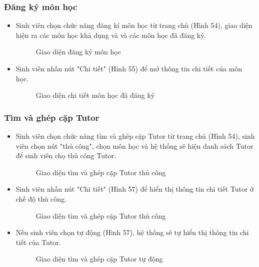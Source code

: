 \subsubsection*{Đăng ký môn học}
\begin{itemize}
    \item Sinh viên chọn chức năng đăng kí môn học từ trang chủ (Hình 54), giao diện hiện ra các môn học khả dụng và và các môn học đã đăng ký.
    \begin{figure}[H]
    \centering
    \setlength{\fboxsep}{2pt}     
    \setlength{\fboxrule}{0.5pt}   
    \caption{Giao diện đăng ký môn học}
    \end{figure}
    \item Sinh viên nhấn nút "Chi tiết" (Hình 55) để mở thông tin chi tiết của môn học.
    \begin{figure}[H]
    \centering
    \setlength{\fboxsep}{2pt}     
    \setlength{\fboxrule}{0.5pt}   
    \caption{Giao diện chi tiết môn học đã đăng ký}
    \end{figure}
\end{itemize}

\subsubsection*{Tìm và ghép cặp Tutor}
\begin{itemize}
    \item Sinh viên chọn chức năng tìm và ghép cặp Tutor từ trang chủ (Hình 54), sinh viên chọn nút "thủ công", chọn môn học và hệ thống sẽ hiện danh sách Tutor để sinh viên chọ thủ công Tutor.
    \begin{figure}[H]
    \centering
    \setlength{\fboxsep}{2pt}     
    \setlength{\fboxrule}{0.5pt}   
    \caption{Giao diện tìm và ghép cặp Tutor thủ công}
    \end{figure}
    \item Sinh viên nhấn nút "Chi tiết" (Hình 57) để hiển thị thông tin chi tiết Tutor ở chế độ thủ công.
    \begin{figure}[H]
    \centering
    \setlength{\fboxsep}{2pt}     
    \setlength{\fboxrule}{0.5pt}   
    \caption{Giao diện tìm và ghép cặp Tutor thủ công}
    \end{figure}
    \item Nếu sinh viên chọn tự động (Hình 57), hệ thống sẽ tự hiển thị thông tin chi tiết của Tutor.
    \begin{figure}[H]
    \centering
    \setlength{\fboxsep}{2pt}     
    \setlength{\fboxrule}{0.5pt}   
    \caption{Giao diện tìm và ghép cặp Tutor tự động}
    \end{figure}
\end{itemize}

